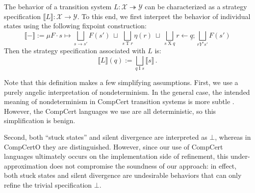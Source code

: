 \documentclass[acmsmall,review,anonymous]{acmart}\settopmatter{printfolios=true,printccs=false,printacmref=false}
\begin{document}
The behavior of a transition system
$L : \mathcal{X} \twoheadrightarrow \mathcal{Y}$
can be characterized as a strategy specification
$\llbracket L \rrbracket : \mathcal{X} \rightarrow \mathcal{Y}$.
To this end,
we first interpret the behavior of individual states
using the following fixpoint construction:
\[
  \llbracket - \rrbracket :=
  \mu F \cdot s \mapsto
   \bigsqcup_{s \rightarrow s'} F(s') \: \sqcup \:
   \bigsqcup_{s \mathrel{T} r} \eta(r) \: \sqcup \:
   \bigsqcup_{s \mathrel{X} q}
    r \mathbin\leftarrow \underline{q} \mathbin;
    \bigsqcup_{r \mathrel{Y^s} s'} F(s')
\]
Then the strategy specification associated with $L$ is:
\[
  \llbracket L \rrbracket(q) :=
    \bigsqcup_{q \mathrel{I} s} \llbracket s \rrbracket
    \,.
\]

Note that this definition makes a few simplifying assumptions.
First,
we use a purely angelic interpretation of nondeterminism.
In the general case,
the intended meaning of nondeterminism in CompCert transition systems
is more subtle \cite[\S8.1]{thesis}.
However,
the CompCert languages we use are all deterministic,
so this simplification is benign.

Second,
both ``stuck states'' and silent divergence
are interpreted as $\bot$,
whereas in CompCertO they are distinguished.
However,
since our use of CompCert languages
ultimately occurs on the implementation side of refinement,
this under-approximation does not compromise
the soundness of our approach:
in effect,
both stuck states and silent divergence
are undesirable behaviors that can 
only refine the trivial specification $\bot$.

\end{document}

